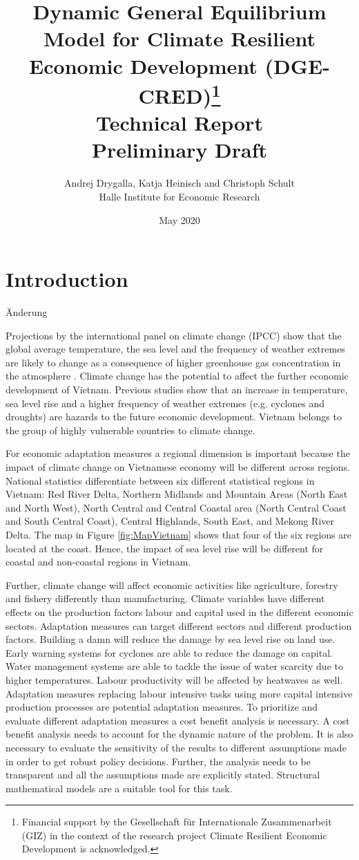 \documentclass[10pt,a4paper]{article}
\title{Dynamic General Equilibrium Model for Climate Resilient Economic Development (DGE-CRED)\thanks{Financial support by the Gesellschaft für Internationale Zusammenarbeit (GIZ) in the context of the research project Climate Resilient Economic Development is acknowledged.}\\
\hspace{1cm}
\large{Technical Report} \\
\hspace{1cm}
\large{Preliminary Draft}}
\date{May 2020}
\author{Andrej Drygalla, Katja Heinisch and Christoph Schult \\ Halle Institute for Economic Research}
\begin{document}
\maketitle

\section{Introduction}

Änderung

Projections by the international panel on climate change (IPCC) show that the global average temperature, the sea level and the frequency of weather extremes are likely to change as a consequence of higher greenhouse gas concentration in the atmosphere \cite{stocker2013climate}. Climate change has the potential to affect the further economic development of Vietnam. Previous studies \citep[e.g.][]{arndt2015economic,wassmann2004sea,chen2012climate} show that an increase in temperature, sea level rise and a higher frequency of weather extremes (e.g. cyclones and droughts) are hazards to the future economic development. Vietnam belongs to the group of highly vulnerable countries to climate change.

For economic adaptation measures a regional dimension is important because the impact of climate change on Vietnamese economy will be different across regions. National statistics differentiate between six different statistical regions in Vietnam: Red River Delta, Northern Midlands and Mountain Areas (North East and North West), North Central and Central Coastal area (North Central Coast and South Central Coast), Central Highlands, South East, and Mekong River Delta. The map in Figure \ref{fig:MapVietnam} shows that four of the six regions are located at the coast. Hence, the impact of sea level rise will be different for coastal and non-coastal regions in Vietnam. 

Further, climate change will affect economic activities like agriculture, forestry and fishery differently than manufacturing. Climate variables have different effects on the production factors labour and capital used in the different economic sectors. Adaptation measures can target different sectors and different production factors. Building a damn will reduce the damage by sea level rise on land use. Early warning systems for cyclones are able to reduce the damage on capital. Water management systems are able to tackle the issue of water scarcity due to higher temperatures. Labour productivity will be affected by heatwaves as well. Adaptation measures replacing labour intensive tasks using more capital intensive production processes are potential adaptation measures. To prioritize and evaluate different adaptation measures a cost benefit analysis is necessary. A cost benefit analysis needs to account for the dynamic nature of the problem. It is also necessary to evaluate the sensitivity of the results to different assumptions made in order to get robust policy decisions. Further, the analysis needs to be transparent and all the assumptions made are explicitly stated. Structural mathematical models are a suitable tool for this task. 
\end{document}
